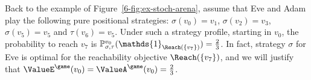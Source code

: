 Back to the example of Figure~\cref{6-fig:ex-stoch-arena}, assume that
Eve and Adam play the following pure positional strategies:
$\sigma(v_0) = v_1$, $\sigma(v_2) = v_3$, $\sigma(v_5) = v_5$ and
$\tau(v_6) = v_5$. Under such a strategy profile, starting in $v_0$,
the probability to reach $v_7$ is
$\probm_{\sigma,\tau}^{v_0}(\mathds{1}_{\Reach(\{v_7\})}) = \frac 2
3$. In fact, strategy $\sigma$ for Eve is optimal for the
reachability objective $\Reach(\{v_7\})$, and we will justify that
$\ValueE^\game(v_0) = \ValueA^\game(v_0) = \frac 2 3$.

